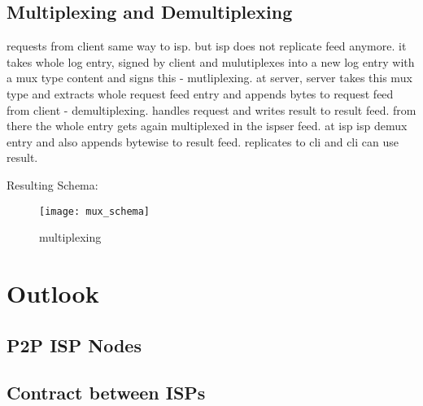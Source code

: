 \subsection{Multiplexing and Demultiplexing}
requests from client same way to isp. but isp does not replicate feed anymore. it takes whole log entry, signed by client and mulutiplexes into a new log entry with a mux type content and signs this - mutliplexing. at server, server takes this mux type and extracts whole request feed entry and appends bytes to request feed from client - demultiplexing. handles request and writes result to result feed. from there the whole entry gets again multiplexed in the ispser feed. at isp isp demux entry and also appends bytewise to result feed. replicates to cli and cli can use result.

Resulting Schema:

\begin{figure}
    \centering
    \texttt{[image: mux\_schema]}
    \caption{multiplexing}
    \label{fig:mux}
\end{figure}

\section{Outlook}
\subsection{P2P ISP Nodes}
\subsection{Contract between ISPs}
